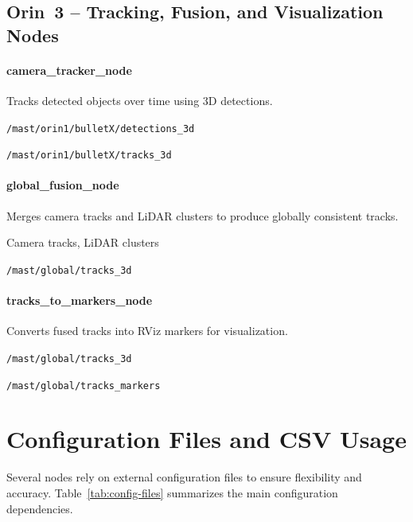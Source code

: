 \documentclass[12pt,a4paper]{report}
\begin{document}
\subsection{Orin~3 -- Tracking, Fusion, and Visualization Nodes}

\paragraph{camera\_tracker\_node}
\begin{description}[leftmargin=1.3cm,style=nextline]
    \item[Function] Tracks detected objects over time using 3D detections.
    \item[Subscribes] \texttt{/mast/orin1/bulletX/detections\_3d}
    \item[Publishes] \texttt{/mast/orin1/bulletX/tracks\_3d}
\end{description}

\paragraph{global\_fusion\_node}
\begin{description}[leftmargin=1.3cm,style=nextline]
    \item[Function] Merges camera tracks and LiDAR clusters to produce globally consistent tracks.
    \item[Subscribes] Camera tracks, LiDAR clusters
    \item[Publishes] \texttt{/mast/global/tracks\_3d}
\end{description}

\paragraph{tracks\_to\_markers\_node}
\begin{description}[leftmargin=1.3cm,style=nextline]
    \item[Function] Converts fused tracks into RViz markers for visualization.
    \item[Subscribes] \texttt{/mast/global/tracks\_3d}
    \item[Publishes] \texttt{/mast/global/tracks\_markers}
\end{description}

\section{Configuration Files and CSV Usage}
Several nodes rely on external configuration files to ensure flexibility and accuracy. Table~\ref{tab:config-files} summarizes the main configuration dependencies.
\end{document}
